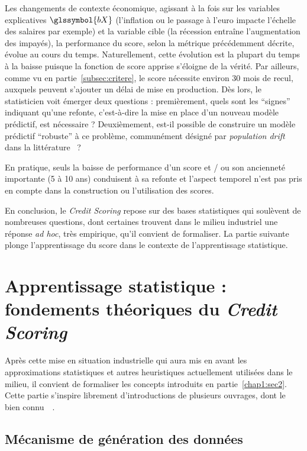 Les changements de contexte économique, agissant à la fois sur les variables explicatives $\glssymbol{bX}$ (l'inflation ou le passage à l'euro impacte l'échelle des salaires par exemple) et la variable cible (la récession entraîne l'augmentation des impayés), la performance du score, selon la métrique précédemment décrite, évolue au cours du temps. Naturellement, cette évolution est la plupart du temps à la baisse puisque la fonction de score apprise s'éloigne de la vérité. Par ailleurs, comme vu en partie~\ref{subsec:critere}, le score nécessite environ 30 mois de recul, auxquels peuvent s'ajouter un délai de mise en production. Dès lors, le statisticien voit émerger deux questions : premièrement, quels sont les ``signes'' indiquant qu'une refonte, c'est-à-dire la mise en place d'un nouveau modèle prédictif, est nécessaire ? Deuxièmement, est-il possible de construire un modèle prédictif ``robuste'' à ce problème, communément désigné par \textit{population drift} dans la littérature~\cite{hand1997statistical} ?

En pratique, seuls la baisse de performance d'un score et / ou son ancienneté importante (5 à 10 ans) conduisent à sa refonte et l'aspect temporel n'est pas pris en compte dans la construction ou l'utilisation des scores.

\medskip

En conclusion, le \textit{Credit Scoring} repose sur des bases statistiques qui soulèvent de nombreuses questions, dont certaines trouvent dans le milieu industriel une réponse \textit{ad hoc}, très empirique, qu'il convient de formaliser. La partie suivante plonge l'apprentissage du score dans le contexte de l'apprentissage statistique.

\section{Apprentissage statistique : fondements théoriques du \textit{Credit Scoring}} \label{chap1:sec3}

Après cette mise en situation industrielle qui aura mis en avant les approximations statistiques et autres heuristiques actuellement utilisées dans le milieu, il convient de formaliser les concepts introduits en partie~\ref{chap1:sec2}. Cette partie s'inspire librement d'introductions de plusieurs ouvrages, dont le bien connu~~\cite{friedman2001elements}.

\subsection{Mécanisme de génération des données}

